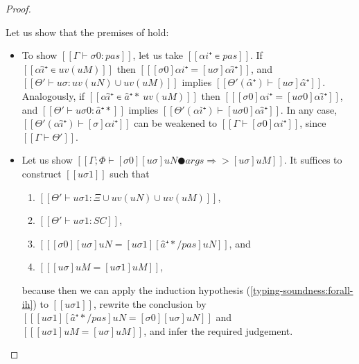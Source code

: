 \begin{proof}
\begin{caseof}
\begin{enumerate}
                    Let us show that the premises of 
                     hold:
                    \begin{itemize}
                        \item To show $[[Γ ⊢ σ0 : pas]]$,
                            let us take $[[αi⁺ ∊ {pas}]]$.
                            If $[[ αî⁺ ∊ uv(uM)]]$
                            then $[[ [σ0]αi⁺ = [uσ]αî⁺ ]]$,
                            and $[[ Θ' ⊢ uσ : uv(uN) ∪ uv(uM) ]]$
                            implies $[[Θ'(α̂⁺) ⊢ [uσ]α̂⁺]]$.
                            Analogously, if $[[ αî⁺ ∊ {â⁺*} \ uv(uM)]]$
                            then $[[ [σ0]αi⁺ = [uσ0]αî⁺ ]]$,
                            and $[[Θ' ⊢ uσ0 : â⁺*]]$ implies $[[Θ'(αî⁺) ⊢ [uσ0]αî⁺]]$.
                            In any case, $[[Θ'(αî⁺) ⊢ [σ]αi⁺ ]]$
                            can be weakened to $[[Γ ⊢ [σ0]αi⁺]]$, 
                            since $[[Γ ⊢ Θ']]$.

                        \item Let us show $[[Γ; Φ ⊢ [σ0][uσ]uN ● args ⇒> [uσ]uM ]]$.
                            It suffices to construct $[[uσ1]]$ such that
                            \begin{enumerate}
                                \item $[[Θ' ⊢ uσ1 : Ξ ∪ uv(uN) ∪ uv(uM)]]$,
                                \item $[[Θ' ⊢ uσ1 : SC]]$,
                                \item $[[ [σ0][uσ]uN = [uσ1][â⁺*/pas]uN]]$, and
                                \item $[[ [uσ]uM = [uσ1]uM]]$,
                            \end{enumerate}
                            because then we can apply the induction hypothesis
                            (\ref{typing-soundness:forall-ih}) to
                            $[[uσ1]]$, rewrite the conclusion by 
                            $[[ [uσ1][â⁺*/pas]uN = [σ0][uσ]uN]]$ and
                            $[[ [uσ1]uM = [uσ]uM]]$, and infer the required judgement.


\end{itemize}
\end{enumerate}
\end{caseof}
\end{proof}

